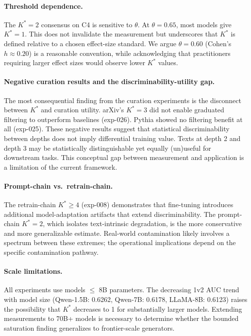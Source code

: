 \documentclass[11pt,a4paper]{article}
\begin{document}
\paragraph{Threshold dependence.}
The $K^* = 2$ consensus on C4 is sensitive to $\theta$. At $\theta = 0.65$, most models give $K^* = 1$. This does not invalidate the measurement but underscores that $K^*$ is defined relative to a chosen effect-size standard. We argue $\theta = 0.60$ (Cohen's $h \approx 0.20$) is a reasonable convention, while acknowledging that practitioners requiring larger effect sizes would observe lower $K^*$ values.

\paragraph{Negative curation results and the discriminability-utility gap.}
The most consequential finding from the curation experiments is the disconnect between $K^*$ and curation utility. arXiv's $K^* = 3$ did not enable graduated filtering to outperform baselines (exp-026). Pythia showed no filtering benefit at all (exp-025). These negative results suggest that statistical discriminability between depths does not imply differential training value. Texts at depth 2 and depth 3 may be statistically distinguishable yet equally (un)useful for downstream tasks. This conceptual gap between measurement and application is a limitation of the current framework.

\paragraph{Prompt-chain vs.\ retrain-chain.}
The retrain-chain $K^* \geq 4$ (exp-008) demonstrates that fine-tuning introduces additional model-adaptation artifacts that extend discriminability. The prompt-chain $K^* = 2$, which isolates text-intrinsic degradation, is the more conservative and more generalizable estimate. Real-world contamination likely involves a spectrum between these extremes; the operational implications depend on the specific contamination pathway.

\paragraph{Scale limitations.}
All experiments use models $\leq$ 8B parameters. The decreasing 1v2 AUC trend with model size (Qwen-1.5B: 0.6262, Qwen-7B: 0.6178, LLaMA-8B: 0.6123) raises the possibility that $K^*$ decreases to 1 for substantially larger models. Extending measurements to 70B+ models is necessary to determine whether the bounded saturation finding generalizes to frontier-scale generators.
\end{document}
